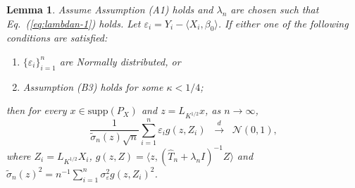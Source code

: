 \documentclass[11pt,a4paper]{article}
\renewcommand{\hat}{\widehat}
\renewcommand{\tilde}{\widetilde}
\theoremstyle{definition}
\theoremstyle{plain}
\newtheorem{lemma}{Lemma}[section]
\theoremstyle{remark}
\newcommand{\supp}{\mathrm{supp}}
\begin{document}
\begin{lemma}
Assume Assumption (A1) holds and $\lambda_n$ are chosen such that Eq.~(\ref{eq:lambdan-1}) holds. Let $\varepsilon_i = Y_i - \langle X_i,\beta_0\rangle$. If \emph{either} one of the following conditions are satisfied:
\begin{enumerate}
\item $\{\varepsilon_i\}_{i=1}^n$ are Normally distributed, or
\item Assumption (B3) holds for some $\kappa<1/4$;
\end{enumerate}
then for every $x\in\supp(P_X)$ and $z=L_{K^{1/2}}x$, as $n\to\infty$, 
$$
\frac{1}{\tilde\sigma_n(z)\sqrt{n}}\sum_{i=1}^n \varepsilon_i g(z,Z_i)\;\;\overset{d}{\to}\;\; \mathcal N(0,1),
$$
where $Z_i=L_{K^{1/2}}X_i$, $g(z,Z)=\langle z,(\hat T_n+\lambda_n I)^{-1}Z\rangle$ and $\tilde\sigma_n(z)^2 = n^{-1}\sum_{i=1}^n \sigma_\varepsilon^2g(z,Z_i)^2$.
\label{lem:clt}
\end{lemma}
\end{document}
